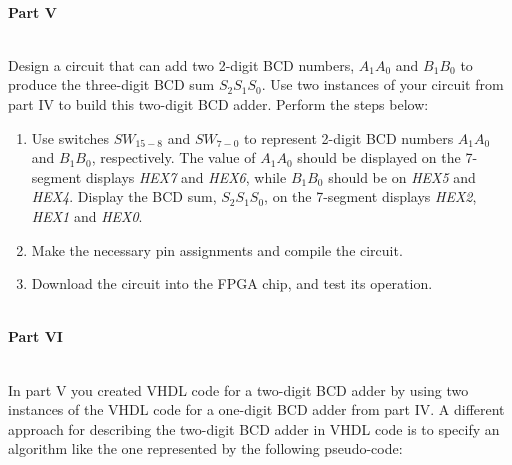 \documentclass[psfig,10pt,fullpage]{article}
\begin{document}
~\\
\noindent
{\bf Part V}

~\\
\noindent
Design a circuit that can add two 2-digit BCD numbers, $A_1 A_0$ and $B_1 B_0$ to produce
the three-digit BCD sum $S_2 S_1 S_0$. Use two instances of your circuit
from part IV to build this two-digit BCD adder. Perform the steps below:
\begin{enumerate}
\item Use switches $SW_{15-8}$ and $SW_{7-0}$ to represent 2-digit 
BCD numbers $A_1 A_0$ and $B_1 B_0$, respectively.
The value of $A_1 A_0$ should be displayed on the 7-segment displays {\it HEX7} 
and {\it HEX6}, while $B_1 B_0$ should be on {\it HEX5} and {\it HEX4}.
Display the BCD sum, $S_2 S_1 S_0$, on the 7-segment displays {\it HEX2},
{\it HEX1} and {\it HEX0}.
\item Make the necessary pin assignments and compile the circuit.
\item Download the circuit into the FPGA chip, and test its operation.
\end{enumerate}

~\\
\noindent
{\bf Part VI}

~\\
In part V you created VHDL code for a two-digit BCD adder by using two instances of the
VHDL code for a one-digit BCD adder from part IV. A different approach for describing
the two-digit BCD adder in VHDL code is to specify an algorithm like the one
represented by the following pseudo-code:
\end{document}
